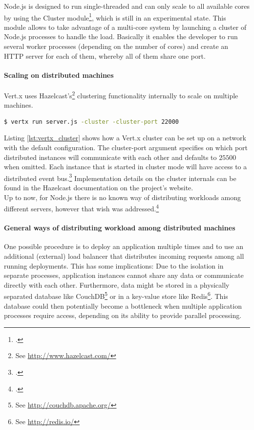 Node.js is designed to run single-threaded and can only scale to all available
cores by using the Cluster module\footcite[Cf.][]{node_2012b}, which is still in an experimental state.
This module allows to take advantage of a multi-core system by launching a cluster of Node.js processes to handle the load. Basically it enables the developer to run several worker processes (depending on the number of cores) and create an HTTP server for each of them, whereby all of them share one port. 


\paragraph{Scaling on distributed machines}
Vert.x uses Hazelcast's\footnote{See \url{http://www.hazelcast.com/}} clustering
functionality internally to scale on multiple machines.\\

\begin{lstlisting}[language=bash,
caption={Starting a Vert.x application in cluster mode},
label={lst:vertx_cluster},
morekeywords={vertx}]
$ vertx run server.js -cluster -cluster-port 22000
\end{lstlisting}%

Listing \ref{lst:vertx_cluster} shows how a Vert.x cluster can be set up on a
network with the default configuration. The cluster-port argument specifies on
which port distributed instances will communicate with each other and defaults
to $25500$ when omitted.
Each instance that is started in cluster mode will have access to a distributed
event bus.\footcite[Cf.][]{vertx_2012} Implementation details on the cluster
internals can be found in the Hazelcast documentation on the project's
website.\\

Up to now, for Node.js there is no known way of distributing workloads among
different servers, however that wish was
addressed.\footcite[Cf.][]{node_clusterserver}


\paragraph{General ways of distributing workload among distributed machines}
One possible procedure is to deploy an application multiple times and to use an additional (external) load balancer that
distributes incoming requests among all running deployments. This has some
implications: Due to the isolation in separate processes, application instances cannot share any
data or communicate directly with each other.
Furthermore, data might be stored in a physically separated database like CouchDB\footnote{See
\url{http://couchdb.apache.org/}} or in a key-value store like Redis\footnote{See
\url{http://redis.io/}}. This database could then potentially become a bottleneck when multiple application
processes require access, depending on its ability to provide parallel processing.

